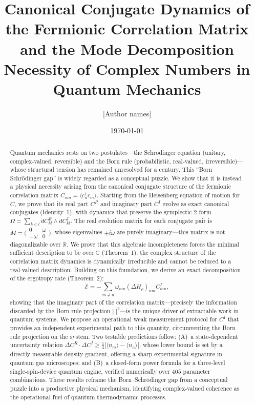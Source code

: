 \documentclass[aps,pra,preprint,groupedaddress,amsmath,amssymb,floatfix]{revtex4-2}
\begin{document}
\title{Canonical Conjugate Dynamics of the Fermionic Correlation Matrix
       and the Mode Decomposition Necessity of Complex Numbers in Quantum Mechanics}

\author{[Author names]}
\affiliation{[Institution]}
\email{[email]}

\date{\today}

\begin{abstract}
Quantum mechanics rests on two postulates---the Schr\"odinger equation (unitary, complex-valued, reversible) and the Born rule (probabilistic, real-valued, irreversible)---whose structural tension has remained unresolved for a century. This ``Born--Schr\"odinger gap'' is widely regarded as a conceptual puzzle. We show that it is instead a physical necessity arising from the canonical conjugate structure of the fermionic correlation matrix $C_{mn} = \langle c^\dagger_n c_m \rangle$. Starting from the Heisenberg equation of motion for $C$, we prove that its real part $C^R$ and imaginary part $C^I$ evolve as exact canonical conjugates (Identity~1), with dynamics that preserve the symplectic $2$-form $\Omega = \sum_{k<l} dC^R_{kl} \wedge dC^I_{kl}$. The real evolution matrix for each conjugate pair is $M = \bigl(\begin{smallmatrix}0 & \omega \\ -\omega & 0\end{smallmatrix}\bigr)$, whose eigenvalues $\pm i\omega$ are purely imaginary---this matrix is not diagonalizable over $\mathbb{R}$. We prove that this algebraic incompleteness forces the minimal sufficient description to be over $\mathbb{C}$ (Theorem~1): the complex structure of the correlation matrix dynamics is dynamically irreducible and cannot be reduced to a real-valued description. Building on this foundation, we derive an exact decomposition of the ergotropy rate (Theorem~2):
\[
\dot{\mathcal{E}} = -\sum_{m\neq n} \omega_{mn} (\Delta H_\rho)_{nm} C^I_{mn},
\]
showing that the imaginary part of the correlation matrix---precisely the information discarded by the Born rule projection $|\cdot|^2$---is the unique driver of extractable work in quantum systems. We propose an operational weak measurement protocol for $C^I$ that provides an independent experimental path to this quantity, circumventing the Born rule projection on the system. Two testable predictions follow: (A)~a state-dependent uncertainty relation $\Delta C^R \cdot \Delta C^I \ge \frac{1}{4}|\langle n_m\rangle - \langle n_n\rangle|$, whose lower bound is set by a directly measurable density gradient, offering a sharp experimental signature in quantum gas microscopes; and (B)~a closed-form power formula for a three-level single-spin-device quantum engine, verified numerically over $405$ parameter combinations. These results reframe the Born--Schr\"odinger gap from a conceptual puzzle into a productive physical mechanism, identifying complex-valued coherence as the operational fuel of quantum thermodynamic processes.
\end{abstract}
\end{document}
